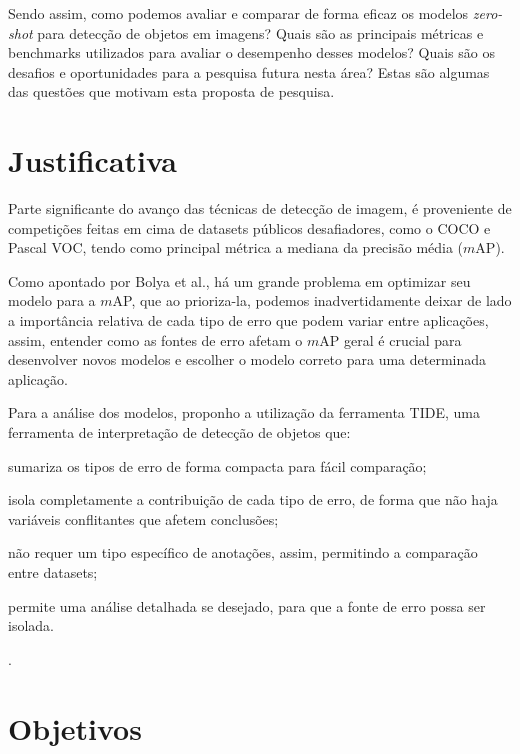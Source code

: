 \documentclass[openany, a4paper,12pt, oneside]{article}
\def\map{\(\mathit{m}\)AP}
\begin{document}
Sendo assim, como podemos avaliar e comparar de forma eficaz os modelos \textit{zero-shot} para detecção de objetos em imagens? Quais são as principais métricas e benchmarks utilizados para avaliar o desempenho desses modelos? Quais são os desafios e oportunidades para a pesquisa futura nesta área? Estas são algumas das questões que motivam esta proposta de pesquisa.

\section{Justificativa}

Parte significante do avan\c{c}o das t\'{e}cnicas de detec\c{c}\~{a}o de imagem, \'{e} proveniente de competi\c{c}\~{o}es feitas em cima de datasets p\'{u}blicos desafiadores, como o COCO\cite{lin2015} e Pascal VOC\cite{everingham2010}, tendo como principal m\'{e}trica a mediana da precis\~{a}o m\'{e}dia (\map).

Como apontado por Bolya et al.\cite{tide}, h\'{a} um grande problema em optimizar seu modelo para a \map, que ao prioriza-la, podemos inadvertidamente deixar de lado a import\^{a}ncia relativa de cada tipo de erro que podem variar entre aplica\c{c}\~{o}es, assim, entender como as fontes de erro afetam o {\map} geral \'{e} crucial para desenvolver novos modelos e escolher o modelo correto para uma determinada aplica\c{c}\~{a}o.

Para a an\'{a}lise dos modelos, proponho a utiliza\c{c}\~{a}o da ferramenta TIDE, uma ferramenta de interpreta\c{c}\~{a}o de detec\c{c}\~{a}o de objetos que:
\begin{inparaenum}[(i)]
  \item sumariza os tipos de erro de forma compacta para f\'{a}cil compara\c{c}\~{a}o;
  \item isola completamente a contribui\c{c}\~{a}o de cada tipo de erro, de forma que n\~{a}o haja vari\'{a}veis conflitantes que afetem conclus\~{o}es;
  \item n\~{a}o requer um tipo espec\'{i}fico de anota\c{c}\~{o}es, assim, permitindo a compara\c{c}\~{a}o entre datasets;
  \item permite uma an\'{a}lise detalhada se desejado, para que a fonte de erro possa ser isolada.
\end{inparaenum}
\cite{tide}.

\section{Objetivos}
\end{document}
